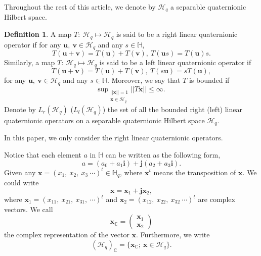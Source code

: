\documentclass[pdflatex,sn-mathphys-num]{sn-jnl}%
\theoremstyle{thmstyleone}%
\theoremstyle{thmstyletwo}%
\theoremstyle{thmstylethree}%
\newtheorem{definition}{Definition}%
\theoremstyle{definition}
\newtheorem{definition}[theorem]{Definition}
\theoremstyle{remark}
\begin{document}
Throughout the rest of this article, we denote by $\mathcal{H}_q$ a separable quaternionic Hilbert space.

\begin{definition}
A map $T:\ \mathcal{H}_q \mapsto \mathcal{H}_q$ is said to be a right linear quaternionic operator if for any $\boldsymbol{u},\ \boldsymbol{v}\in \mathcal{H}_q $ and any $s\in\mathbb{H}$,
\[
T(\boldsymbol{u}+\boldsymbol{v})=T(\boldsymbol{u})+T(\boldsymbol{v}),\ T(\boldsymbol{u}s)=T(\boldsymbol{u})s.
\]
Similarly, a map $T:\ \mathcal{H}_q  \mapsto \mathcal{H}_q $ is said to be a left linear quaternionic operator if
\[
T(\boldsymbol{u}+\boldsymbol{v})=T(\boldsymbol{u})+T(\boldsymbol{v}),\ T(s\boldsymbol{u})=sT(\boldsymbol{u}),
\]
for any $\boldsymbol{u},\ \boldsymbol{v}\in \mathcal{H}_q $ and any $s\in\mathbb{H}$.
Moreover, we say that $T$ is bounded if
$$\mathrm{sup}_{\substack{||\boldsymbol{x}||= 1\\ \boldsymbol{x}\in \mathcal{H}_q}} ||T\boldsymbol{x}||\le \infty.$$
Denote by $L_r(\mathcal{H}_q)$ ($L_l(\mathcal{H}_q)$) the set of all the bounded right (left) linear quaternionic operators on a separable quaternionic Hilbert space
$\mathcal{H}_q$.
\end{definition}

In this paper, we only consider the right linear quaternionic operators.






Notice that each element $a$ in $\mathbb{H}$ can be written as the following form,
\[
a=(a_0+a_1\boldsymbol{i})+\boldsymbol{j}(a_2+a_3\boldsymbol{i}).
\]
Given any $\boldsymbol{x}=(x_1,\ x_2,\ x_3\ \cdots)^t\in\mathbb{H}_q$, where $\boldsymbol{x}^t$ means the transposition of $\boldsymbol{x}$. We could write
\[
\boldsymbol{x}=\boldsymbol{x}_1+\boldsymbol{j}\boldsymbol{x}_2,
\]
where $\boldsymbol{x}_1=(x_{11},\ x_{21},\ x_{31},\ \cdots)^t$ and $\boldsymbol{x}_2=(x_{12},\ x_{22},\ x_{32}\ \cdots)^t$ are complex vectors. We call
\[
\boldsymbol{x}_\mathbb{C}=\begin{pmatrix}
	\boldsymbol{x}_1 \\
	\boldsymbol{x}_2
\end{pmatrix}
\]
the complex representation of the vector $\boldsymbol{x}$. Furthermore, we write
\[
(\mathcal{H}_q)_{\mathbb{C}}=\{\boldsymbol{x}_\mathbb{C}; ~\boldsymbol{x}\in\mathcal{H}_q\}.
\]
\end{document}
